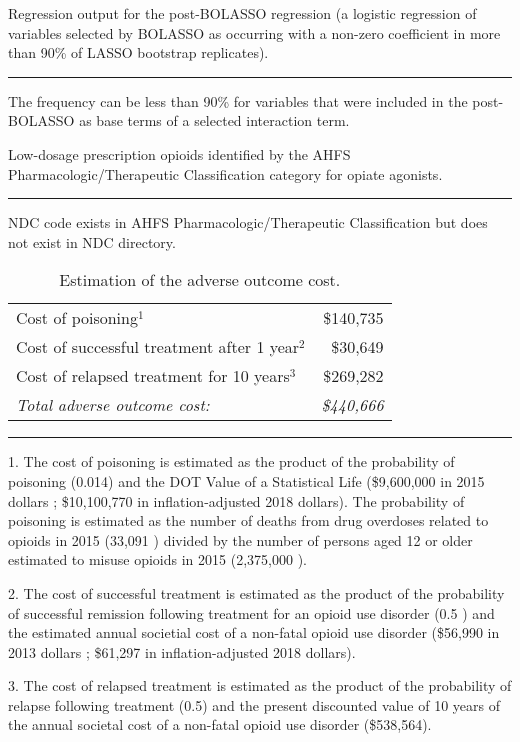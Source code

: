 \documentclass[9pt,twoside]{pnas-new}
\begin{document}
\begin{table}
\caption{Regression output for the post-BOLASSO regression (a logistic regression of variables selected by BOLASSO as occurring with a non-zero coefficient in more than 90\% of LASSO bootstrap replicates).}
\centering
\small

\hrule
\begin{tablenotes}
\footnotesize
\item * The frequency can be less than 90\% for variables that were included in the post-BOLASSO as base terms of a selected interaction term.
\end{tablenotes}
\end{table}

\begin{table}
\caption{Low-dosage prescription opioids identified by the AHFS Pharmacologic/Therapeutic Classification category for opiate agonists.}
\centering
\footnotesize

\hrule
\begin{tablenotes}
\footnotesize
\item * NDC code exists in AHFS Pharmacologic/Therapeutic Classification but does not exist in NDC directory.
\end{tablenotes}
\end{table}

\begin{table}
\caption{Estimation of the adverse outcome cost.}
\centering
\begin{tabular}{lr}
Cost of poisoning$^1$ & \$140,735 \\
Cost of successful treatment after 1 year$^2$ & \$30,649 \\
Cost of relapsed treatment for 10 years$^3$ & \$269,282 \\
\hline
\em Total adverse outcome cost: & \em \$440,666 \\[1em]
\end{tabular}
\hrule
\begin{tablenotes}
\footnotesize
\item 1. The cost of poisoning is estimated as the product of the probability of poisoning (0.014) and the DOT Value of a Statistical Life (\$9,600,000 in 2015 dollars \cite{vsl}; \$10,100,770 in inflation-adjusted 2018 dollars). The probability of poisoning is estimated as the number of deaths from drug overdoses related to opioids in 2015 (33,091 \cite{nida1}) divided by the number of persons aged 12 or older estimated to misuse opioids in 2015 (2,375,000 \cite{nida2}).
\item 2. The cost of successful treatment is estimated as the product of the probability of successful remission following treatment for an opioid use disorder (0.5 \cite{weiss}) and the estimated annual societial cost of a non-fatal opioid use disorder (\$56,990 in 2013 dollars \cite{florence}; \$61,297 in inflation-adjusted 2018 dollars).
\item 3. The cost of relapsed treatment is estimated as the product of the probability of relapse following treatment (0.5) and the present discounted value of 10 years of the annual societal cost of a non-fatal opioid use disorder (\$538,564).
\end{tablenotes}
\end{table}
\end{document}
